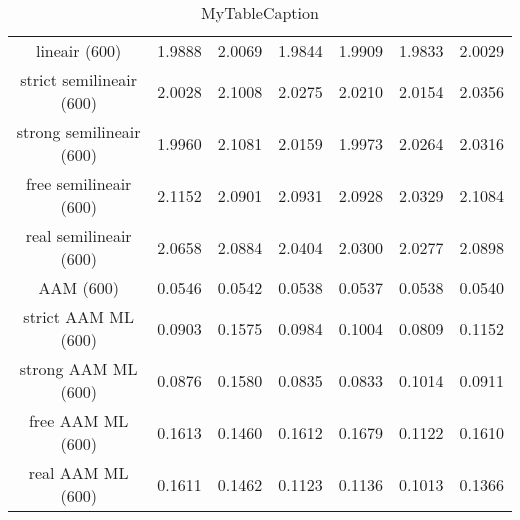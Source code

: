\begin{table}
\centering
\begin{tabular}{|c|c|c|c|c|c|c|}
\hline
 &  &  &  &  &  &  \\
\hline
lineair (600) & 1.9888 & 2.0069 & 1.9844 & 1.9909 & 1.9833 & 2.0029 \\
\hline
strict semilineair (600) & 2.0028 & 2.1008 & 2.0275 & 2.0210 & 2.0154 & 2.0356 \\
\hline
strong semilineair (600) & 1.9960 & 2.1081 & 2.0159 & 1.9973 & 2.0264 & 2.0316 \\
\hline
free semilineair (600) & 2.1152 & 2.0901 & 2.0931 & 2.0928 & 2.0329 & 2.1084 \\
\hline
real semilineair (600) & 2.0658 & 2.0884 & 2.0404 & 2.0300 & 2.0277 & 2.0898 \\
\hline
AAM (600) & 0.0546 & 0.0542 & 0.0538 & 0.0537 & 0.0538 & 0.0540 \\
\hline
strict AAM ML (600) & 0.0903 & 0.1575 & 0.0984 & 0.1004 & 0.0809 & 0.1152 \\
\hline
strong AAM ML (600) & 0.0876 & 0.1580 & 0.0835 & 0.0833 & 0.1014 & 0.0911 \\
\hline
free AAM ML (600) & 0.1613 & 0.1460 & 0.1612 & 0.1679 & 0.1122 & 0.1610 \\
\hline
real AAM ML (600) & 0.1611 & 0.1462 & 0.1123 & 0.1136 & 0.1013 & 0.1366 \\
\hline
\end{tabular}
\caption{MyTableCaption}
\label{table:MyTableLabel}
\end{table}
